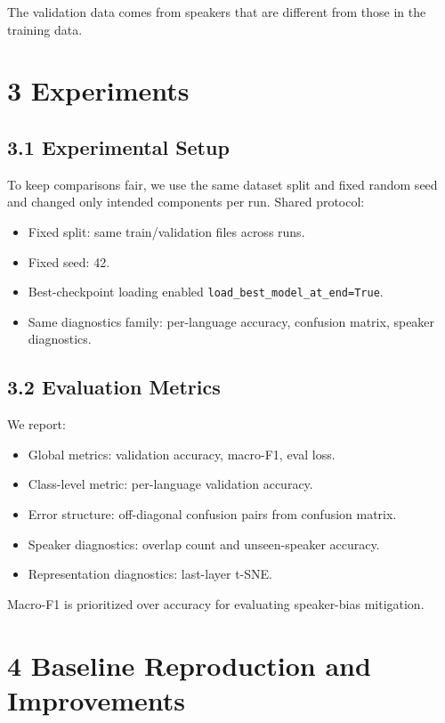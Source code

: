 \documentclass[11pt]{article}
\begin{document}
The validation data comes from speakers that are different from those in the training data.

\section*{3 Experiments}
\subsection*{3.1 Experimental Setup}
To keep comparisons fair, we use the same dataset split and fixed random seed and changed only intended components per run. Shared protocol:
\begin{itemize}
    \item Fixed split: same train/validation files across runs.
    \item Fixed seed: 42.
    \item Best-checkpoint loading enabled \texttt{load\_best\_model\_at\_end=True}.
    \item Same diagnostics family: per-language accuracy, confusion matrix, speaker diagnostics.
\end{itemize}

\subsection*{3.2 Evaluation Metrics}
We report:
\begin{itemize}
    \item Global metrics: validation accuracy, macro-F1, eval loss.
    \item Class-level metric: per-language validation accuracy.
    \item Error structure: off-diagonal confusion pairs from confusion matrix.
    \item Speaker diagnostics: overlap count and unseen-speaker accuracy.
    \item Representation diagnostics: last-layer t-SNE.
\end{itemize}

Macro-F1 is prioritized over accuracy for evaluating speaker-bias mitigation.

\section*{4 Baseline Reproduction and Improvements}
\end{document}
